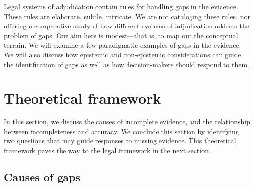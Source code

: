 \documentclass[
  10pt,
  dvipsnames,enabledeprecatedfontcommands]{scrartcl}
\begin{document}
Legal systems of adjudication contain rules for handling gaps in the
evidence. These rules are elaborate, subtle, intricate. We are not
cataloging these rules, nor offering a comparative study of how
different systems of adjudication address the problem of gaps. Our aim
here is modest---that is, to map out the conceptual terrain. We will
examine a few paradigmatic examples of gaps in the evidence. We will
also discuss how epistemic and non-epistemic considerations can guide
the identification of gaps as well as how decision-makers should respond
to them.

\hypertarget{theoretical-framework}{%
\section{Theoretical framework}\label{theoretical-framework}}

In this section, we discuss the causes of incomplete evidence, and the
relationship between incompleteness and accuracy. We conclude this
section by identifying two questions that may guide responses to missing
evidence. This theoretical framework paves the way to the legal
framework in the next section.

\hypertarget{causes-of-gaps}{%
\subsection{Causes of gaps}\label{causes-of-gaps}}
\end{document}
